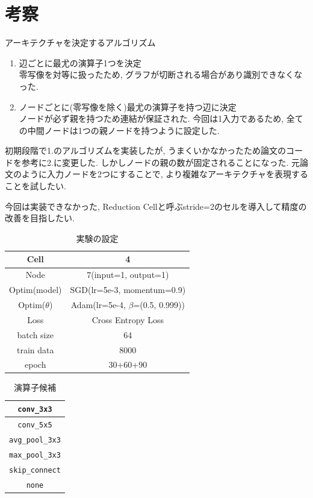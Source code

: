 \documentclass[twocolumn]{jarticle}     %
\begin{document}
\section{考察}
アーキテクチャを決定するアルゴリズム
\begin{enumerate}
  \item 辺ごとに最尤の演算子1つを決定\\
  零写像を対等に扱ったため, グラフが切断される場合があり識別できなくなった.
  \item ノードごとに(零写像を除く)最尤の演算子を持つ辺に決定\\
  ノードが必ず親を持つため連結が保証された.
  今回は1入力であるため, 全ての中間ノードは1つの親ノードを持つように設定した.
\end{enumerate}

初期段階で1.のアルゴリズムを実装したが, うまくいかなかったため論文\cite{DBLP:journals/corr/abs-1806-09055}のコードを参考に2.に変更した.
しかしノードの親の数が固定されることになった.
元論文のように入力ノードを2つにすることで, より複雑なアーキテクチャを表現することを試したい.

今回は実装できなかった, Reduction Cellと呼ぶstride=2のセルを導入して精度の改善を目指したい.

\begin{table}[tb]
  \begin{center}
    \caption{実験の設定}
    \begin{tabular}{|c|c|} \hline
      Cell & 4 \\ \hline
      Node & 7(input=1, output=1) \\ \hline
      Optim(model) & SGD(lr=5e-3, momentum=0.9) \\ \hline
      Optim($\theta$) & Adam(lr=5e-4, $\beta$=(0.5, 0.999)) \\ \hline
      Loss & Cross Entropy Loss \\ \hline
      batch size & 64 \\ \hline
      train data & 8000 \\ \hline
      epoch & 30+60+90 \\ \hline
    \end{tabular}
    \label{tab:setting}
  \end{center}
\end{table}

\begin{table}[tb]
  \begin{center}
    \caption{演算子候補}
    \begin{tabular}{|c|} \hline
      \verb|conv_3x3| \\ \hline
      \verb|conv_5x5| \\ \hline
      \verb|avg_pool_3x3| \\ \hline
      \verb|max_pool_3x3| \\ \hline
      \verb|skip_connect| \\ \hline
      \verb|none| \\ \hline
    \end{tabular}
    \label{tab:ops}
  \end{center}
\end{table}
\end{document}
